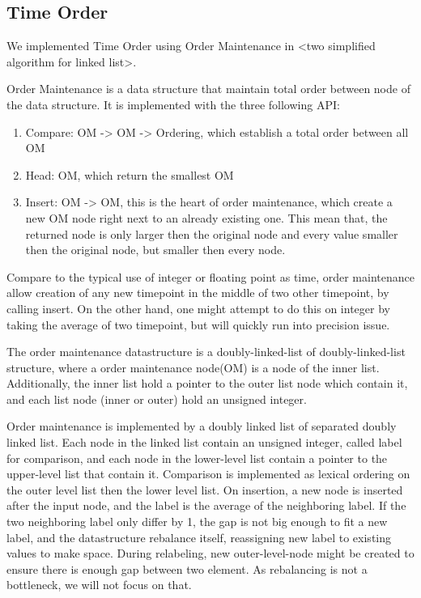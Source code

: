 \documentclass[format=acmsmall, review=false, screen=true]{acmart}
\begin{document}
\subsection{Time Order}
We implemented Time Order using Order Maintenance in <two simplified algorithm for linked list>.

Order Maintenance is a data structure that maintain total order between node of the data structure. It is implemented with the three following API:

\begin{enumerate}
	\item Compare: OM -> OM -> Ordering, which establish a total order between all OM
	\item Head: OM, which return the smallest OM
	\item Insert: OM -> OM, this is the heart of order maintenance, which create a new OM node right next to an already existing one. This mean that, the returned node is only larger then the original node and every value smaller then the original node, but smaller then every node.
\end{enumerate}

Compare to the typical use of integer or floating point as time, order maintenance allow creation of any new timepoint in the middle of two other timepoint, by calling insert. On the other hand, one might attempt to do this on integer by taking the average of two timepoint, but will quickly run into precision issue.

The order maintenance datastructure is a doubly-linked-list of doubly-linked-list structure, where a order maintenance node(OM) is a node of the inner list. Additionally, the inner list hold a pointer to the outer list node which contain it, and each list node (inner or outer) hold an unsigned integer.

Order maintenance is implemented by a doubly linked list of separated doubly linked list. Each node in the linked list contain an unsigned integer, called label for comparison, and each node in the lower-level list contain a pointer to the upper-level list that contain it. Comparison is implemented as lexical ordering on the outer level list then the lower level list. On insertion, a new node is inserted after the input node, and the label is the average of the neighboring label. If the two neighboring label only differ by 1, the gap is not big enough to fit a new label, and the datastructure rebalance itself, reassigning new label to existing values to make space. During relabeling, new outer-level-node might be created to ensure there is enough gap between two element. As rebalancing is not a bottleneck, we will not focus on that.
\end{document}

